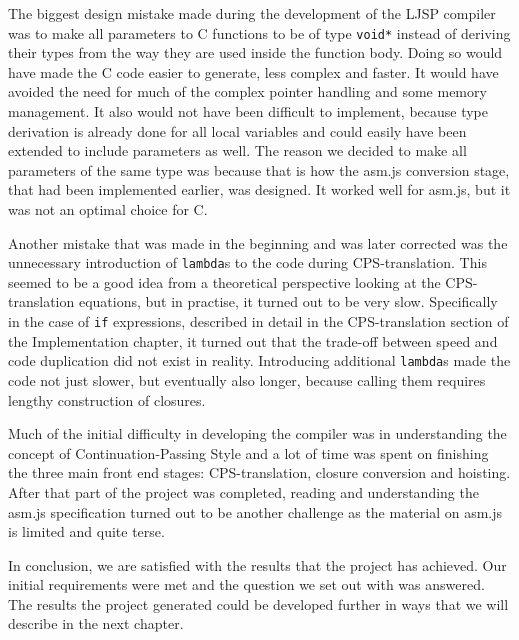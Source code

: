 \documentclass[11pt]{report}
\begin{document}
The biggest design mistake made during the development of the LJSP compiler was to make all parameters to C functions to be of type \texttt{void*} instead of deriving their types from the way they are used inside the function body. Doing so would have made the C code easier to generate, less complex and faster. It would have avoided the need for much of the complex pointer handling and some memory management. It also would not have been difficult to implement, because type derivation is already done for all local variables and could easily have been extended to include parameters as well. The reason we decided to make all parameters of the same type was because that is how the asm.js conversion stage, that had been implemented earlier, was designed. It worked well for asm.js, but it was not an optimal choice for C.


Another mistake that was made in the beginning and was later corrected was the unnecessary introduction of \texttt{lambda}s to the code during CPS-translation. This seemed to be a good idea from a theoretical perspective looking at the CPS-translation equations, but in practise, it turned out to be very slow. Specifically in the case of \texttt{if} expressions, described in detail in the CPS-translation section of the Implementation chapter, it turned out that the trade-off between speed and code duplication did not exist in reality. Introducing additional \texttt{lambda}s made the code not just slower, but eventually also longer, because calling them requires lengthy construction of closures.

Much of the initial difficulty in developing the compiler was in understanding the concept of Continuation-Passing Style and a lot of time was spent on finishing the three main front end stages: CPS-translation, closure conversion and hoisting. After that part of the project was completed, reading and understanding the asm.js specification turned out to be another challenge as the material on asm.js is limited and quite terse.

In conclusion, we are satisfied with the results that the project has achieved. Our initial requirements were met and the question we set out with was answered. The results the project generated could be developed further in ways that we will describe in the next chapter.
\end{document}
